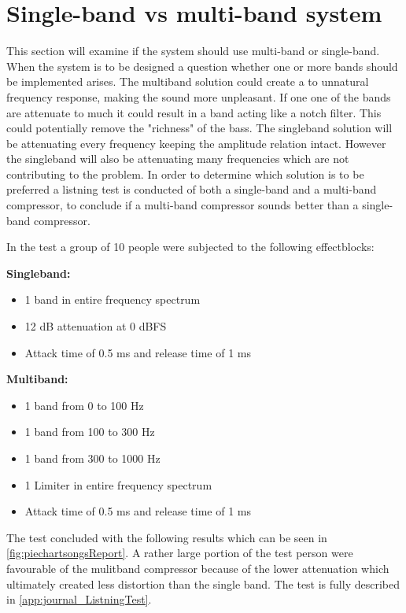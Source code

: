 \section{Single-band vs multi-band system}
This section will examine if the system should use multi-band or single-band. When the system is to be designed a question whether one or more bands should be implemented arises. The multiband solution could create a to unnatural frequency response, making the sound more unpleasant. If one one of the bands are attenuate to much it could result in a band acting like a notch filter. This could potentially remove the "richness" of the bass. The singleband solution will be attenuating every frequency keeping the amplitude relation intact. However the singleband will also be attenuating many frequencies which are not contributing to the problem. In order to determine which solution is to be preferred a listning test is conducted of both a single-band and a multi-band compressor, to conclude if a multi-band compressor sounds better than a single-band compressor. 

In the test a group of 10 people were subjected to the following effectblocks:
\noindent\begin{minipage}[t]{0.5\linewidth}
    \textbf{Singleband:}
    \begin{itemize}
    \item 1 band in entire frequency spectrum
    \item 12 dB attenuation at 0 dBFS
    \item Attack time of 0.5 ms and release time of 1 ms
    \end{itemize}
    \end{minipage}%
    \begin{minipage}[t]{0.5\linewidth}
    \textbf{Multiband:}
    \begin{itemize}
    \item 1 band from 0 to 100 Hz
    \item 1 band from 100 to 300 Hz
    \item 1 band from 300 to 1000 Hz
    \item 1 Limiter in entire frequency spectrum
    \item Attack time of 0.5 ms and release time of 1 ms
    \end{itemize}
\end{minipage}\par\bigskip

The test concluded with the following results which can be seen in \autoref{fig:piechartsongsReport}. A rather large portion of the test person were favourable of the mulitband compressor because of the lower attenuation which ultimately created less distortion than the single band. The test is fully described in \autoref{app:journal_ListningTest}.

